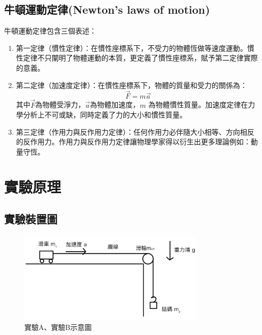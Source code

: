 \documentclass[11pt,a4paper]{article}
\theoremstyle{definition}
\begin{document}
        \subsection{牛頓運動定律(Newton's laws of motion)}

        牛頓運動定律包含三個表述：
        
            \begin{enumerate}
                \item 第一定律（慣性定律）：在慣性座標系下，不受力的物體恆做等速度運動。慣性定律不只闡明了物體運動的本質，更定義了慣性座標系，賦予第二定律實際的意義。
                \item 第二定律（加速度定律）：在慣性座標系下，物體的質量和受力的關係為：
                \begin{equation}
                    \vec{F} = m\vec{a}
                \end{equation}
                其中$\vec{F}$為物體受淨力，$\vec{a}$為物體加速度，$m$ 為物體慣性質量。加速度定律在力學分析上不可或缺，同時定義了力的大小和慣性質量。
                \item 第三定律（作用力與反作用力定律）：任何作用力必伴隨大小相等、方向相反的反作用力。作用力與反作用力定律讓物理學家得以衍生出更多理論例如：動量守恆。
            \end{enumerate}

    \section{實驗原理}

        \subsection{實驗裝置圖}
        
        \begin{figure}[H]
            \centering
            \includegraphics[width=0.8\textwidth]{水平軌道示意圖.png}
            \caption{實驗A、實驗B示意圖}
            \label{fig:實驗A、實驗B示意圖}
        \end{figure}
\end{document}
